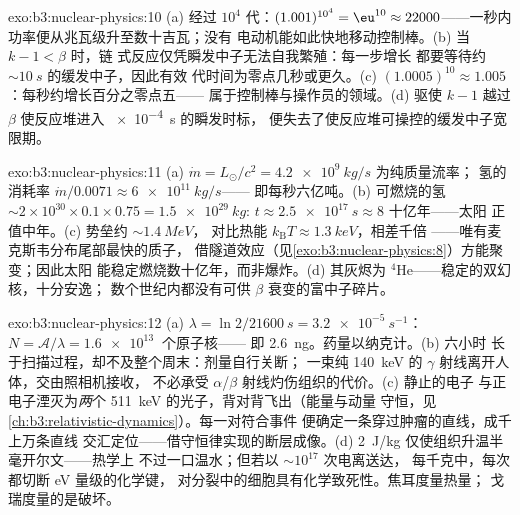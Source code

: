 \begin{solution}{exo:b3:nuclear-physics:10}
(a) 经过 $10^4$ 代：$(1.001)^{10^4} = \eu^{10} \approx
22000$——一秒内功率便从兆瓦级升至数十吉瓦；没有
电动机能如此快地移动控制棒。(b) 当 $k - 1 < \beta$ 时，链
式反应仅凭瞬发中子无法自我繁殖：每一步增长
都要等待约 ${\sim}\qty{10}{s}$ 的缓发中子，因此有效
代时间为零点几秒或更久。(c)
$(1.0005)^{10} \approx 1.005$：每秒约增长百分之零点五——
属于控制棒与操作员的领域。(d) 驱使 $k - 1$ 越过 $\beta$
使反应堆进入 \qty{e-4}{s} 的瞬发时标，
便失去了使反应堆可操控的缓发中子宽限期。
\end{solution}

\begin{solution}{exo:b3:nuclear-physics:11}
(a) $\dot m = L_\odot/c^2 = \qty{4.2e9}{kg/s}$ 为纯质量流率；
氢的消耗率 $\dot m/0.0071 \approx \qty{6e11}{kg/s}$——
即每秒六亿吨。(b) 可燃烧的氢
${\sim}2\times10^{30}\times0.1\times0.75 = \qty{1.5e29}{kg}$:
$t \approx \qty{2.5e17}{s} \approx 8$ 十亿年——太阳
正值中年。(c) 势垒约 ${\sim}\qty{1.4}{MeV}$，
对比热能 $k_{\text{B}}T \approx \qty{1.3}{keV}$，相差千倍
——唯有麦克斯韦分布尾部最快的质子，
借隧道效应（见\cref{exo:b3:nuclear-physics:8}）方能聚变；因此太阳
能稳定燃烧数十亿年，而非爆炸。(d) 其灰烬为
$^4$He——稳定的双幻核，十分安逸；
数个世纪内都没有可供 $\beta$ 衰变的富中子碎片。
\end{solution}

\begin{solution}{exo:b3:nuclear-physics:12}
(a) $\lambda = \ln2/\qty{21600}{s} = \qty{3.2e-5}{s^{-1}}$：
$N = \mathcal A/\lambda = \qty{1.6e13}{}$ 个原子核——
即 \qty{2.6}{ng}。药量以纳克计。(b) 六小时
长于扫描过程，却不及整个周末：剂量自行关断；
一束纯 \qty{140}{keV} 的 $\gamma$ 射线离开人体，交由照相机接收，
不必承受 $\alpha$/$\beta$ 射线灼伤组织的代价。(c) 静止的电子
与正电子湮灭为\emph{两}个
\qty{511}{keV} 的光子，背对背飞出（能量与动量
守恒，见\cref{ch:b3:relativistic-dynamics}）。每一对符合事件
便确定一条穿过肿瘤的直线，成千上万条直线
交汇定位——借守恒律实现的断层成像。(d)
\qty{2}{J/kg} 仅使组织升温半毫开尔文——热学上
不过一口温水；但若以 ${\sim}10^{17}$ 次电离送达，
每千克中，每次都切断 \unit{eV} 量级的化学键，
对分裂中的细胞具有化学致死性。焦耳度量热量；
戈瑞度量的是破坏。
\end{solution}

